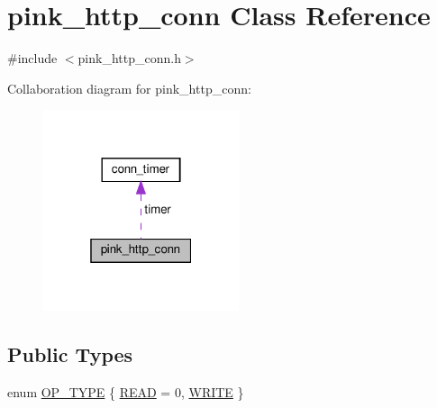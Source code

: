 \hypertarget{classpink__http__conn}{}\section{pink\+\_\+http\+\_\+conn Class Reference}
\label{classpink__http__conn}


{\ttfamily \#include $<$pink\+\_\+http\+\_\+conn.\+h$>$}



Collaboration diagram for pink\+\_\+http\+\_\+conn\+:
\nopagebreak
\begin{figure}[H]
\begin{center}
\leavevmode
\includegraphics[width=163pt]{classpink__http__conn__coll__graph}
\end{center}
\end{figure}
\subsection*{Public Types}
\begin{DoxyCompactItemize}
\item 
enum \hyperlink{classpink__http__conn_a7959fd18f89efd188dcbc662ff65ddcb}{O\+P\+\_\+\+T\+Y\+PE} \{ \hyperlink{classpink__http__conn_a7959fd18f89efd188dcbc662ff65ddcba811e1ebb2bb8557c98390936e96af25e}{R\+E\+AD} = 0, 
\hyperlink{classpink__http__conn_a7959fd18f89efd188dcbc662ff65ddcba36bef4cc85522d8b97cabc2a031d5dfd}{W\+R\+I\+TE}
 \}
\end{DoxyCompactItemize}
